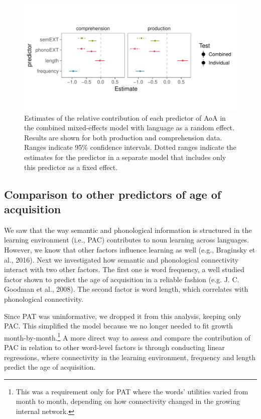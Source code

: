 \documentclass[english,floatsintext,man]{apa6}
\theoremstyle{definition}
\theoremstyle{definition}
\theoremstyle{definition}
\theoremstyle{remark}
\begin{document}
\begin{figure}[!h]
\includegraphics[width=\textwidth]{figs/plot_static_preds_all} \caption{Estimates of the relative contribution of each predictor of AoA in the combined mixed-effects model with language as a random effect. Results are shown for both production and comprehension data. Ranges indicate 95\% confidence intervals. Dotted ranges indicate the estimates for the predictor in a separate model that includes only this predictor as a fixed effect.}\label{fig:staticAll}
\end{figure}

\subsection{Comparison to other predictors of age of
acquisition}\label{comparison-to-other-predictors-of-age-of-acquisition}

We saw that the way semantic and phonological information is structured
in the learning environment (i.e., PAC) contributes to noun learning
across languages. However, we know that other factors influence learning
as well (e.g., Braginsky et al., 2016). Next we investigated how
semantic and phonological connectivity interact with two other factors.
The first one is word frequency, a well studied factor shown to predict
the age of acquisition in a reliable fashion (e.g. J. C. Goodman et al.,
2008). The second factor is word length, which correlates with
phonological connectivity.

Since PAT was uninformative, we dropped it from this analysis, keeping
only PAC. This simplified the model because we no longer needed to fit
growth
month-by-month.\footnote{This was a requirement only for PAT where the words' utilities varied from month to month, depending on how connectivity changed in the growing internal network.}
A more direct way to assess and compare the contribution of PAC in
relation to other word-level factors is through conducting linear
regressions, where connectivity in the learning environment, frequency
and length predict the age of acquisition.
\end{document}
